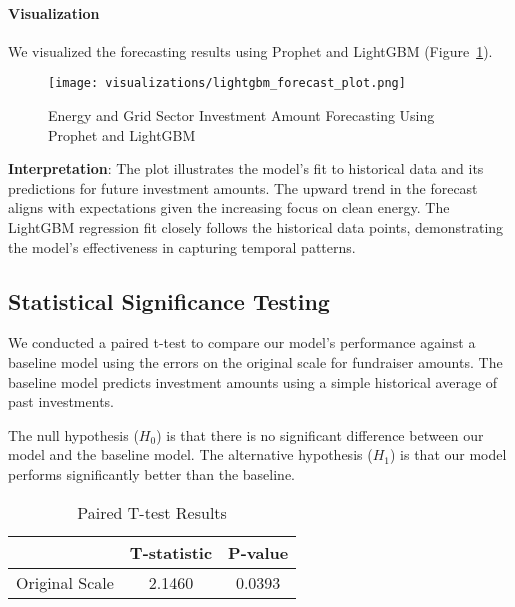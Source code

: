 \documentclass[sigconf]{acmart}
\begin{document}
\paragraph{Visualization}

We visualized the forecasting results using Prophet and LightGBM (Figure~\ref{fig:forecast_plot}).

\begin{figure}[htpb]
    \centering
    \texttt{[image: visualizations/lightgbm\_forecast\_plot.png]}
    \caption{Energy and Grid Sector Investment Amount Forecasting Using Prophet and LightGBM}
    \label{fig:forecast_plot}
\end{figure}

\textbf{Interpretation}: The plot illustrates the model's fit to historical data and its predictions for future investment amounts. The upward trend in the forecast aligns with expectations given the increasing focus on clean energy. The LightGBM regression fit closely follows the historical data points, demonstrating the model's effectiveness in capturing temporal patterns.

\subsection{Statistical Significance Testing}

We conducted a paired t-test to compare our model's performance against a baseline model using the errors on the original scale for fundraiser amounts. The baseline model predicts investment amounts using a simple historical average of past investments.

The null hypothesis ($H_0$) is that there is no significant difference between our model and the baseline model. The alternative hypothesis ($H_1$) is that our model performs significantly better than the baseline.

\begin{table}[htpb]
    \centering
    \caption{Paired T-test Results}
    \label{tab:t_test_results}
    \begin{tabular}{lcc}
        \toprule
        & \textbf{T-statistic} & \textbf{P-value} \\
        \midrule
        Original Scale & 2.1460 & 0.0393 \\
        \bottomrule
    \end{tabular}
\end{table}
\end{document}
